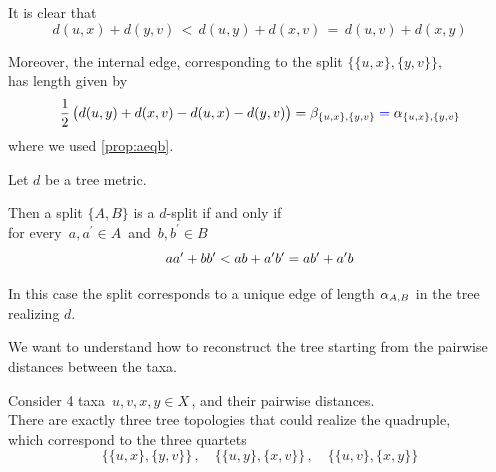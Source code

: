 \documentclass[./main.tex]{subfiles}
\begin{document}
It is clear that
\[ d(u,x) + d(y,v) \,<\, d(u,y) + d(x,v) \,=\, d(u,v) + d(x,y) \]

Moreover, the internal edge, corresponding to the split $\bigl\{ \{u,x\},\{y,v\} \bigr\}$, \\
has length given by
\[ \frac{1}{2}\, \bigl( d(u,y) + d(x,v) - d(u,x) - d(y,v) \bigr) = \beta_{\{u,x\},\{y,v\}} \mathcolor{blue}{=} \alpha_{\{u,x\},\{y,v\}} \]
where we used \autoref{prop:aeqb}.

\begin{fact}
    Let $d$ be a tree metric. 
    
    Then a split $\{A,B\}$ is a $d$-split if and only if \\[2pt]
    for every $\, a,a^\prime \in A \,$ and $\, b,b^\prime \in B \,$
    \[ a a^\prime + b b^\prime < a b + a^\prime b^\prime = a b^\prime + a^\prime b \nospblw \]

    In this case the split corresponds to a unique edge of length $\alpha_{A,B}$ in the tree realizing $d$.
\end{fact}

\clearpage

We want to understand how to reconstruct the tree starting from the pairwise distances between the taxa.\bigskip

Consider 4 taxa $\, u,v,x,y \in X \,$, and their pairwise distances. \\
There are exactly three tree topologies that could realize the quadruple, \\
which correspond to the three quartets
\[ \bigl\{ \{u,x\},\{y,v\} \bigr\} \,,\quad \bigl\{ \{u,y\},\{x,v\} \bigr\} \,,\quad \bigl\{ \{u,v\},\{x,y\} \bigr\} \]

\begin{figure}[h]
    \centering
\end{figure}\medskip
\end{document}
